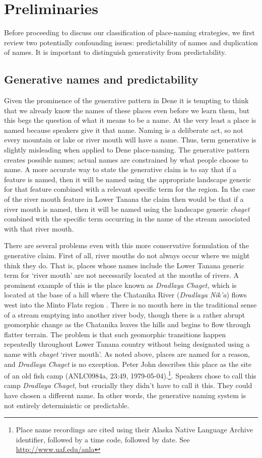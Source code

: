 \section{Preliminaries}
Before proceeding to discuss our classification of place-naming strategies, we first review two potentially confounding issues: predictability of names and duplication of names. It is important to distinguish generativity from predictability.


\subsection{Generative names and predictability}
Given the prominence of the generative pattern in Dene it is tempting to think that we already know the names of these places even before we learn them, but this begs the question of what it means to be a name. At the very least a place is named because speakers give it that name. Naming is a deliberate act, so not every mountain or lake or river mouth will have a name. Thus, term generative is slightly misleading when applied to Dene place-naming. The generative pattern creates possible names; actual names are constrained by what people choose to name. A more accurate way to state the generative claim is to say that if a feature is named, then it will be named using the appropriate landscape generic for that feature combined with a relevant specific term for the region. In the case of the river mouth feature in Lower Tanana the claim then would be that if a river mouth is named, then it will be named using the landscape generic \textit{chaget} combined with the specific term occurring in the name of the stream associated with that river mouth. 

There are several problems even with this more conservative formulation of the generative claim. First of all, river mouths do not always occur where we might think they do. That is, places whose names include the Lower Tanana generic term for ‘river mouth’ are not necessarily located at the mouths of rivers. A prominent example of this is the place known as \textit{Dradlaya Chaget,} which is located at the base of a hill where the Chatanika River (\textit{Dradlaya Nik’a}) flows west into the Minto Flats region \citep[see][]{holton2011c}. There is no mouth here in the traditional sense of a stream emptying into another river body, though there is a rather abrupt geomorphic change as the Chatanika leaves the hills and begins to flow through flatter terrain. The problem is that such geomorphic transitions happen repeatedly throughout Lower Tanana country without being designated using a name with \textit{chaget} ‘river mouth’. As noted above, places are named for a reason, and \textit{Dradlaya Chaget} is no exception. Peter John describes this place as the site of an old fish camp (ANLC0984a, 23:49, 1979-05-04).\footnote{Place name recordings are cited using their Alaska Native Language Archive identifier, followed by a time code, followed by date. See \url{http://www.uaf.edu/anla}}. Speakers chose to call this camp \textit{Dradlaya Chaget}, but crucially they didn’t have to call it this. They could have chosen a different name. In other words, the generative naming system is not entirely deterministic or predictable.


